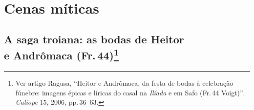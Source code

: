 \chapter{Cenas míticas}

\section[A saga troiana: as bodas de Heitor e Andrômaca (Fr.\,44)]{A saga troiana: as bodas de Heitor\\e Andrômaca (Fr.\,44)\protect\footnote{\MakeUppercase{V}er
artigo \MakeUppercase{R}agusa, ``\MakeUppercase{H}eitor e \MakeUppercase{A}ndrômaca, da festa de bodas à celebração fúnebre:
imagens épicas e líricas do casal na \emph{\MakeUppercase{I}líada} e em \MakeUppercase{S}afo (\MakeUppercase{F}r.\,44 Voigt)''.
\emph{\MakeUppercase{C}alíope} 15, 2006, pp.\,36--63.}}

